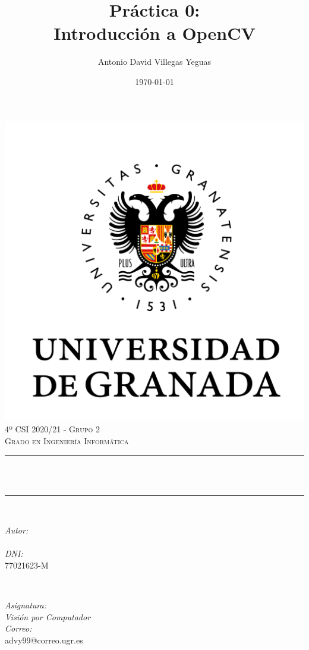 \documentclass[12pt, spanish]{article}
\title{Práctica 0:\\
Introducción a OpenCV  \hspace{0.05cm} }
\author{Antonio David Villegas Yeguas}
\date{\today}
\makeatletter
\let\thetitle\@title
\let\theauthor\@author
\makeatother
\begin{document}

\begin{titlepage}
    \centering
    \vspace*{0.3 cm}
    \includegraphics[scale = 0.50]{ugr.png}\\[0.7 cm]
    \textsc{\large 4º CSI 2020/21 - Grupo 2}\\[0.5 cm]
    \textsc{\large Grado en Ingeniería Informática}\\[0.5 cm]
    \rule{\linewidth}{0.2 mm} \\[0.2 cm]
    { \huge \bfseries \thetitle}\\
    \rule{\linewidth}{0.2 mm} \\[1 cm]

    \begin{minipage}{0.4\textwidth}
        \begin{flushleft} \large
            \emph{Autor:}\\
            \theauthor\\
			 \emph{DNI:}\\
            77021623-M
            \end{flushleft}
            \end{minipage}~
            \begin{minipage}{0.4\textwidth}
            \begin{flushright} \large
            \emph{Asignatura: \\
            Visión por Computador}   \\
            \emph{Correo:}\\
            advy99@correo.ugr.es
        \end{flushright}
    \end{minipage}\\[0.5cm]


\end{titlepage}
\end{document}

